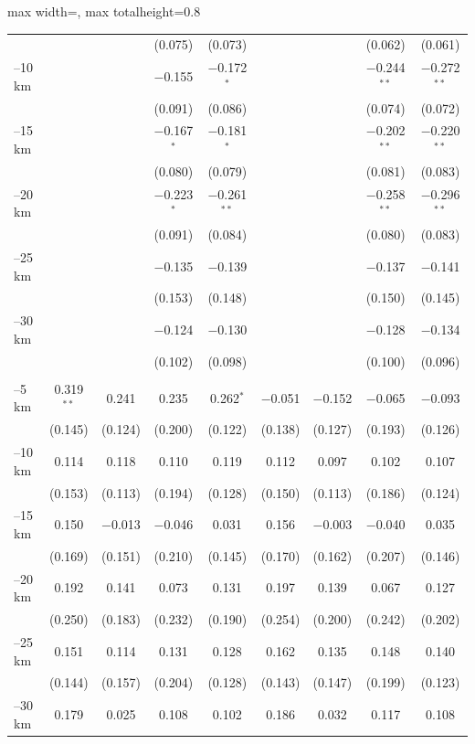 \documentclass[11pt]{article}
\begin{document}
\begin{table}[H]
\begin{adjustbox}{max width=\textwidth, max totalheight=0.8\textheight}
\begin{tabular}{lcccccccc}
 &  &  & (0.075) & (0.073) &  &  & (0.062) & (0.061) \\
\quad 5--10 km &  &  & $-$0.155 & $-$0.172$^{*}$ &  &  & $-$0.244$^{**}$ & $-$0.272$^{**}$ \\
 &  &  & (0.091) & (0.086) &  &  & (0.074) & (0.072) \\
\quad 10--15 km &  &  & $-$0.167$^{*}$ & $-$0.181$^{*}$ &  &  & $-$0.202$^{**}$ & $-$0.220$^{**}$ \\
 &  &  & (0.080) & (0.079) &  &  & (0.081) & (0.083) \\
\quad 15--20 km &  &  & $-$0.223$^{*}$ & $-$0.261$^{**}$ &  &  & $-$0.258$^{**}$ & $-$0.296$^{**}$ \\
 &  &  & (0.091) & (0.084) &  &  & (0.080) & (0.083) \\
\quad 20--25 km &  &  & $-$0.135 & $-$0.139 &  &  & $-$0.137 & $-$0.141 \\
 &  &  & (0.153) & (0.148) &  &  & (0.150) & (0.145) \\
\quad 25--30 km &  &  & $-$0.124 & $-$0.130 &  &  & $-$0.128 & $-$0.134 \\
 &  &  & (0.102) & (0.098) &  &  & (0.100) & (0.096) \\
\addlinespace
\multicolumn{9}{l}{\textit{Catchment: Nyungwe}} \\
\quad 0--5 km & 0.319$^{**}$ & 0.241 & 0.235 & 0.262$^{*}$ & $-$0.051 & $-$0.152 & $-$0.065 & $-$0.093 \\
 & (0.145) & (0.124) & (0.200) & (0.122) & (0.138) & (0.127) & (0.193) & (0.126) \\
\quad 5--10 km & 0.114 & 0.118 & 0.110 & 0.119 & 0.112 & 0.097 & 0.102 & 0.107 \\
 & (0.153) & (0.113) & (0.194) & (0.128) & (0.150) & (0.113) & (0.186) & (0.124) \\
\quad 10--15 km & 0.150 & $-$0.013 & $-$0.046 & 0.031 & 0.156 & $-$0.003 & $-$0.040 & 0.035 \\
 & (0.169) & (0.151) & (0.210) & (0.145) & (0.170) & (0.162) & (0.207) & (0.146) \\
\quad 15--20 km & 0.192 & 0.141 & 0.073 & 0.131 & 0.197 & 0.139 & 0.067 & 0.127 \\
 & (0.250) & (0.183) & (0.232) & (0.190) & (0.254) & (0.200) & (0.242) & (0.202) \\
\quad 20--25 km & 0.151 & 0.114 & 0.131 & 0.128 & 0.162 & 0.135 & 0.148 & 0.140 \\
 & (0.144) & (0.157) & (0.204) & (0.128) & (0.143) & (0.147) & (0.199) & (0.123) \\
\quad 25--30 km & 0.179 & 0.025 & 0.108 & 0.102 & 0.186 & 0.032 & 0.117 & 0.108 \\

\end{tabular}
\end{adjustbox}
\end{table}
\end{document}
